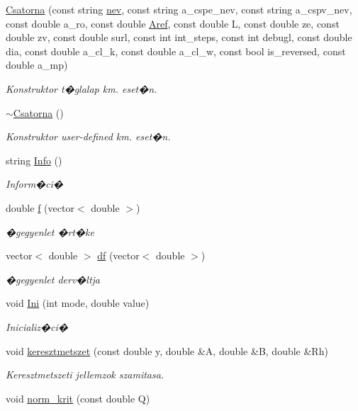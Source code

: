 \begin{DoxyCompactItemize}
\item 
\hyperlink{class_csatorna_ae3829a74761e0507363290fde29af12b}{Csatorna} (const string \hyperlink{class_agelem_abe92b7e3912367d5d1caf6b277ca0b7d}{nev}, const string a\+\_\+cspe\+\_\+nev, const string a\+\_\+cspv\+\_\+nev, const double a\+\_\+ro, const double \hyperlink{class_agelem_a3f8668febc2958fd539997d537552f17}{Aref}, const double L, const double ze, const double zv, const double surl, const int int\+\_\+steps, const int debugl, const double dia, const double a\+\_\+cl\+\_\+k, const double a\+\_\+cl\+\_\+w, const bool is\+\_\+reversed, const double a\+\_\+mp)
\begin{DoxyCompactList}\small\item\em Konstruktor t�glalap km. eset�n. \end{DoxyCompactList}\item 
\hyperlink{class_csatorna_a84452f3df42df853e0600d383cd37d8a}{$\sim$\+Csatorna} ()
\begin{DoxyCompactList}\small\item\em Konstruktor user-\/defined km. eset�n. \end{DoxyCompactList}\item 
string \hyperlink{class_csatorna_a77f24ff76c738a89cb827d251fec0845}{Info} ()
\begin{DoxyCompactList}\small\item\em Inform�ci� \end{DoxyCompactList}\item 
double \hyperlink{class_csatorna_a5cd4e0975717ce0baab89f57a566782a}{f} (vector$<$ double $>$)
\begin{DoxyCompactList}\small\item\em �gegyenlet �rt�ke \end{DoxyCompactList}\item 
vector$<$ double $>$ \hyperlink{class_csatorna_a5330dbbbc669f49382c822ffcc671d16}{df} (vector$<$ double $>$)
\begin{DoxyCompactList}\small\item\em �gegyenlet derv�ltja \end{DoxyCompactList}\item 
void \hyperlink{class_csatorna_ab30adea649ae8708061e211dc450cb06}{Ini} (int mode, double value)
\begin{DoxyCompactList}\small\item\em Inicializ�ci� \end{DoxyCompactList}\item 
void \hyperlink{class_csatorna_ab9528187fc3d40d210c85b72d7856f10}{keresztmetszet} (const double y, double \&A, double \&B, double \&Rh)
\begin{DoxyCompactList}\small\item\em Keresztmetszeti jellemzok szamitasa. \end{DoxyCompactList}\item 
void \hyperlink{class_csatorna_af30a5d124d26bd31548cf243c4a95178}{norm\+\_\+krit} (const double Q)\hypertarget{class_csatorna_af30a5d124d26bd31548cf243c4a95178}{}\label{class_csatorna_af30a5d124d26bd31548cf243c4a95178}


\end{DoxyCompactItemize}
